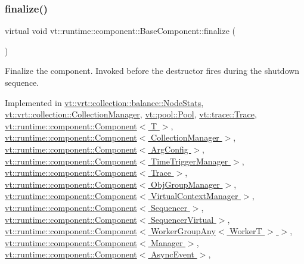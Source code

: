 \subsubsection{\texorpdfstring{finalize()}{finalize()}}
{\footnotesize\ttfamily virtual void vt\+::runtime\+::component\+::\+Base\+Component\+::finalize (\begin{DoxyParamCaption}{ }\end{DoxyParamCaption})\hspace{0.3cm}{\ttfamily [pure virtual]}}



Finalize the component. Invoked before the destructor fires during the shutdown sequence. 



Implemented in \hyperlink{structvt_1_1vrt_1_1collection_1_1balance_1_1_node_stats_a267ac0f73734b89797be774b0bd6e7d1}{vt\+::vrt\+::collection\+::balance\+::\+Node\+Stats}, \hyperlink{structvt_1_1vrt_1_1collection_1_1_collection_manager_afafcdbf36f42835471218b654252031c}{vt\+::vrt\+::collection\+::\+Collection\+Manager}, \hyperlink{structvt_1_1pool_1_1_pool_a45a2880809625a77bb93c3dfcd9c7603}{vt\+::pool\+::\+Pool}, \hyperlink{structvt_1_1trace_1_1_trace_a571333fa708843b1b24079eccfc3ba93}{vt\+::trace\+::\+Trace}, \hyperlink{structvt_1_1runtime_1_1component_1_1_component_a098e362de01af6054e5491fba671a959}{vt\+::runtime\+::component\+::\+Component$<$ T $>$}, \hyperlink{structvt_1_1runtime_1_1component_1_1_component_a098e362de01af6054e5491fba671a959}{vt\+::runtime\+::component\+::\+Component$<$ Collection\+Manager $>$}, \hyperlink{structvt_1_1runtime_1_1component_1_1_component_a098e362de01af6054e5491fba671a959}{vt\+::runtime\+::component\+::\+Component$<$ Arg\+Config $>$}, \hyperlink{structvt_1_1runtime_1_1component_1_1_component_a098e362de01af6054e5491fba671a959}{vt\+::runtime\+::component\+::\+Component$<$ Time\+Trigger\+Manager $>$}, \hyperlink{structvt_1_1runtime_1_1component_1_1_component_a098e362de01af6054e5491fba671a959}{vt\+::runtime\+::component\+::\+Component$<$ Trace $>$}, \hyperlink{structvt_1_1runtime_1_1component_1_1_component_a098e362de01af6054e5491fba671a959}{vt\+::runtime\+::component\+::\+Component$<$ Obj\+Group\+Manager $>$}, \hyperlink{structvt_1_1runtime_1_1component_1_1_component_a098e362de01af6054e5491fba671a959}{vt\+::runtime\+::component\+::\+Component$<$ Virtual\+Context\+Manager $>$}, \hyperlink{structvt_1_1runtime_1_1component_1_1_component_a098e362de01af6054e5491fba671a959}{vt\+::runtime\+::component\+::\+Component$<$ Sequencer $>$}, \hyperlink{structvt_1_1runtime_1_1component_1_1_component_a098e362de01af6054e5491fba671a959}{vt\+::runtime\+::component\+::\+Component$<$ Sequencer\+Virtual $>$}, \hyperlink{structvt_1_1runtime_1_1component_1_1_component_a098e362de01af6054e5491fba671a959}{vt\+::runtime\+::component\+::\+Component$<$ Worker\+Group\+Any$<$ Worker\+T $>$ $>$}, \hyperlink{structvt_1_1runtime_1_1component_1_1_component_a098e362de01af6054e5491fba671a959}{vt\+::runtime\+::component\+::\+Component$<$ Manager $>$}, \hyperlink{structvt_1_1runtime_1_1component_1_1_component_a098e362de01af6054e5491fba671a959}{vt\+::runtime\+::component\+::\+Component$<$ Async\+Event $>$}, 